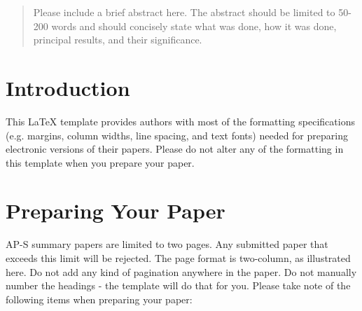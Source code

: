 \documentclass[conference, 10pt]{IEEEtran}
\begin{document}
\maketitle


\begin{abstract}
Please include a brief abstract here. The abstract should be limited to 50-200 words and should concisely state what was done, how it was done, principal results, and their significance.
\end{abstract}





%
\IEEEpeerreviewmaketitle



\section{Introduction}
This LaTeX template provides authors with most of the formatting specifications (e.g. margins, column widths, line spacing, and text fonts) needed for preparing electronic versions of their papers. Please do not alter any of the formatting in this template when you prepare your paper.

\section{Preparing Your Paper}
AP-S summary papers are limited to two pages. Any submitted paper that exceeds this limit will be rejected.  The page format is two-column, as illustrated here.  Do not add any kind of pagination anywhere in the paper. Do not manually number the headings - the template will do that for you.
Please take note of the following items when preparing your paper:
\end{document}
